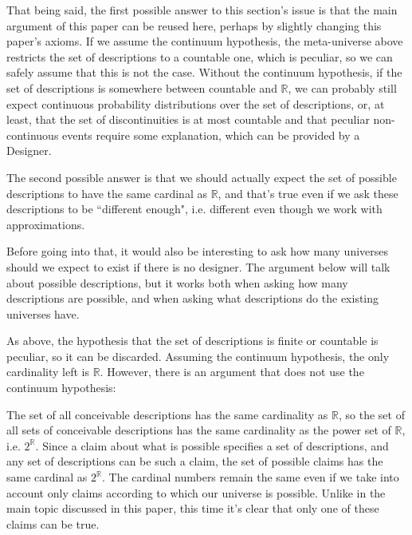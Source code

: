 \documentclass[a4paper
,draft
]{article}
\def\reale{\mathbb{R}}
\newcommand{\paper}[1]{paper}
\newcommand{\ghilimele}[1]{``#1"}
\begin{document}
That being said, the first possible answer to this section's issue
is that the main argument of this \paper{} can be reused here,
perhaps by slightly changing this \paper{}'s
axioms.
If we assume the continuum hypothesis, the meta-universe
above restricts the set of descriptions to a countable one, which is peculiar,
so we can safely assume that this is not the case.
Without the continuum hypothesis, if the set of descriptions is somewhere
between countable and $\reale$, we can probably still expect continuous
probability distributions over the set of descriptions, or, at least,
that the set of discontinuities is at most countable and that peculiar
non-continuous events require some explanation, which can be provided by
a Designer.

The second possible answer is that we should actually expect the set of
possible descriptions to have the same cardinal as $\reale$,
and that's true even
if we ask these descriptions to be \ghilimele{different enough},
i.e. different even though we work with approximations.

Before going into that, it would also be interesting to ask
how many universes should we expect to exist if there is no designer. The
argument below will talk about possible descriptions,
but it works both when asking how many descriptions are possible, and
when asking what descriptions do the existing universes have.

As above, the hypothesis that the set of descriptions is finite or countable
is peculiar, so it can be discarded.
Assuming the continuum hypothesis, the only cardinality left is $\reale$.
However, there is an argument that does not use the continuum hypothesis:

The set of all conceivable descriptions has the same cardinality as $\reale$,
so the set of all sets of conceivable descriptions
has the same cardinality as the power set of $\reale$, i.e. $2^\reale$.
Since a claim about what is possible specifies a set of descriptions, and any
set of descriptions can be such a claim,
the set of possible claims has the same cardinal as $2^\reale$.
The cardinal numbers remain the same even if we take into account only claims
according to which our universe is possible.
Unlike in the main topic discussed in this
\paper{}, this time it's clear that only one of these claims can be true.

\end{document}
